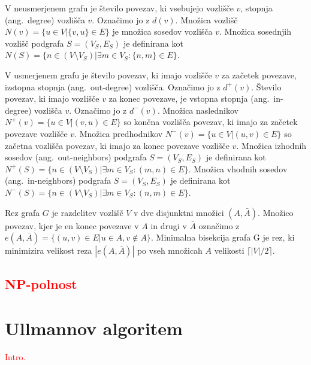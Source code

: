 \documentclass[a4paper, 12pt, ]{book}
\newcommand{\TODO}[1]{\textcolor{red}{#1}}
\begin{document}
	V neusmerjenem grafu je število povezav, ki vsebujejo vozlišče $v$, stopnja (ang.~degree) vozlišča $v$. Označimo jo z $d(v)$. Množica vozlišč
	$N(v) = \{u \in V \big| \{v, u\} \in E\}$ je množica sosedov vozlišča $v$. 
	Množica sosednjih vozlišč podgrafa $S = (V_S, E_S)$ je definirana kot 
	$N(S) = \{ n \in (V \setminus V_S) \big| \exists m \in V_S : \{n,m\} \in E \}$. 

	V usmerjenem grafu je število povezav, ki imajo vozlišče $v$ za začetek
	povezave, 	izstopna stopnja (ang.~out-degree) vozlišča. Označimo jo z $d^+(v)$.
	Število povezav, ki imajo vozlišče $v$ za konec povezave, je vstopna stopnja (ang.~in-degree) vozlišča $v$. Označimo jo z $d^-(v)$.
	Množica naslednikov
	$N^+(v) = \{u \in V \big| (v,u) \in E\}$
	so končna vozlišča povezav, ki imajo za začetek povezave vozlišče $v$.
	Množica predhodnikov 
	$N^-(v) = \{u \in V \big| (u,v) \in E\}$
	so začetna vozlišča povezav, ki imajo za konec povezave vozlišče $v$. 
	Množica izhodnih sosedov (ang.~out-neighbors) podgrafa $S = (V_S, E_S)$ je definirana kot 
	$N^+(S) = \{ n \in (V \setminus V_S) \big| \exists m \in V_S : (m,n) \in E \}$.
	Množica vhodnih sosedov (ang.~in-neighbors) podgrafa $S = (V_S, E_S)$ je definirana kot 
	$N^-(S) = \{ n \in (V \setminus V_S) \big| \exists m \in V_S : (n,m) \in E \}$.

	Rez grafa $G$ je razdelitev vozlišč $V$ v dve disjunktni množici $(A, \bar A)$. Množico povezav, kjer je en konec povezave v $A$ in drugi v
	 $\bar A$ označimo z $e(A, \bar A) = \{(u,v) \in E \big| u \in A, v \not \in A\}$. Minimalna bisekcija  grafa G je rez, ki minimizira velikost reza 
	$| e(A, \bar A) |$ po vseh množicah $A$ velikosti $\lceil | V | / 2 \rceil$.

	\TODO{\section{NP-polnost}}	






\chapter{Ullmannov algoritem}
\TODO{Intro.}
\end{document}

